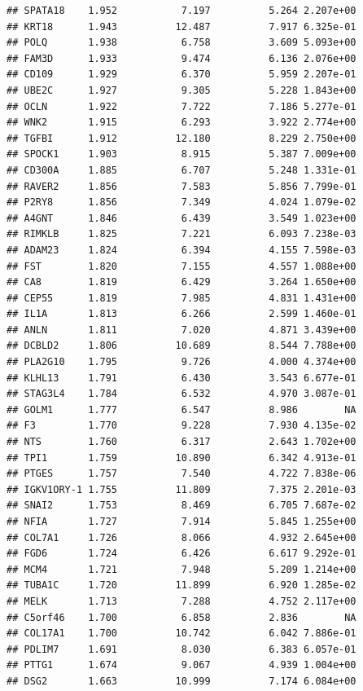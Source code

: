 \documentclass{article}\usepackage[]{graphicx}\usepackage[]{color}
\makeatletter
\newenvironment{kframe}{%
 \def\at@end@of@kframe{}%
 \ifinner\ifhmode%
  \def\at@end@of@kframe{\end{minipage}}%
  \begin{minipage}{\columnwidth}%
 \fi\fi%
 \def\FrameCommand##1{\hskip\@totalleftmargin \hskip-\fboxsep
 \colorbox{shadecolor}{##1}\hskip-\fboxsep
     \hskip-\linewidth \hskip-\@totalleftmargin \hskip\columnwidth}%
 \MakeFramed {\advance\hsize-\width
   \@totalleftmargin\z@ \linewidth\hsize
   \@setminipage}}%
 {\par\unskip\endMakeFramed%
 \at@end@of@kframe}
\newenvironment{knitrout}{}{} %
\makeatother
\begin{document}
\begin{knitrout}
\begin{kframe}
\begin{verbatim}
## SPATA18    1.952           7.197          5.264 2.207e+00
## KRT18      1.943          12.487          7.917 6.325e-01
## POLQ       1.938           6.758          3.609 5.093e+00
## FAM3D      1.933           9.474          6.136 2.076e+00
## CD109      1.929           6.370          5.959 2.207e-01
## UBE2C      1.927           9.305          5.228 1.843e+00
## OCLN       1.922           7.722          7.186 5.277e-01
## WNK2       1.915           6.293          3.922 2.774e+00
## TGFBI      1.912          12.180          8.229 2.750e+00
## SPOCK1     1.903           8.915          5.387 7.009e+00
## CD300A     1.885           6.707          5.248 1.331e-01
## RAVER2     1.856           7.583          5.856 7.799e-01
## P2RY8      1.856           7.349          4.024 1.079e-02
## A4GNT      1.846           6.439          3.549 1.023e+00
## RIMKLB     1.825           7.221          6.093 7.238e-03
## ADAM23     1.824           6.394          4.155 7.598e-03
## FST        1.820           7.155          4.557 1.088e+00
## CA8        1.819           6.429          3.264 1.650e+00
## CEP55      1.819           7.985          4.831 1.431e+00
## IL1A       1.813           6.266          2.599 1.460e-01
## ANLN       1.811           7.020          4.871 3.439e+00
## DCBLD2     1.806          10.689          8.544 7.788e+00
## PLA2G10    1.795           9.726          4.000 4.374e+00
## KLHL13     1.791           6.430          3.543 6.677e-01
## STAG3L4    1.784           6.532          4.970 3.087e-01
## GOLM1      1.777           6.547          8.986        NA
## F3         1.770           9.228          7.930 4.135e-02
## NTS        1.760           6.317          2.643 1.702e+00
## TPI1       1.759          10.890          6.342 4.913e-01
## PTGES      1.757           7.540          4.722 7.838e-06
## IGKV1ORY-1 1.755          11.809          7.375 2.201e-03
## SNAI2      1.753           8.469          6.705 7.687e-02
## NFIA       1.727           7.914          5.845 1.255e+00
## COL7A1     1.726           8.066          4.932 2.645e+00
## FGD6       1.724           6.426          6.617 9.292e-01
## MCM4       1.721           7.948          5.209 1.214e+00
## TUBA1C     1.720          11.899          6.920 1.285e-02
## MELK       1.713           7.288          4.752 2.117e+00
## C5orf46    1.700           6.858          2.836        NA
## COL17A1    1.700          10.742          6.042 7.886e-01
## PDLIM7     1.691           8.030          6.383 6.057e-01
## PTTG1      1.674           9.067          4.939 1.004e+00
## DSG2       1.663          10.999          7.174 6.084e+00

\end{verbatim}
\end{kframe}
\end{knitrout}
\end{document}
